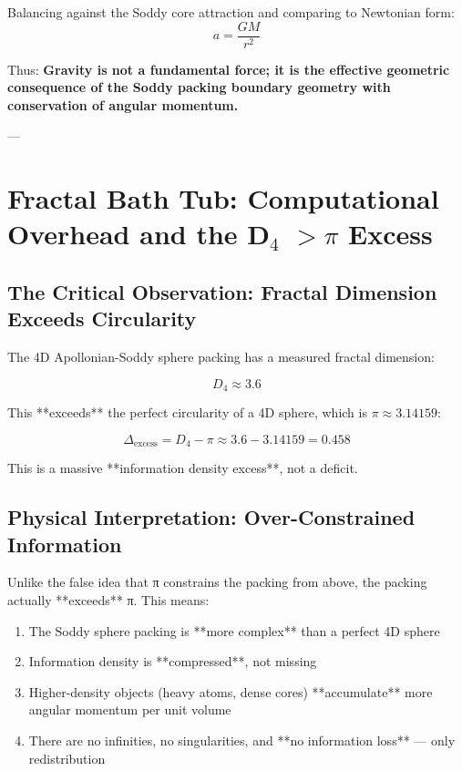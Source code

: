 \documentclass[11pt,a4paper]{article}
\begin{document}
    Balancing against the Soddy core attraction and comparing to Newtonian form:
    \[
    a = \frac{GM}{r^2}
    \]

    Thus: \textbf{Gravity is not a fundamental force; it is the effective geometric consequence of the Soddy packing boundary geometry with conservation of angular momentum.}

---


\section{Fractal Bath Tub: Computational Overhead and the D$_4$ $> \pi$ Excess}

  \subsection{The Critical Observation: Fractal Dimension Exceeds Circularity}

    The 4D Apollonian-Soddy sphere packing has a measured fractal dimension:

    \[
    D_4 \approx 3.6
    \]

    This **exceeds** the perfect circularity of a 4D sphere, which is $\pi \approx 3.14159$:

    \[
    \Delta_{\text{excess}} = D_4 - \pi \approx 3.6 - 3.14159 = 0.458
    \]

    This is a massive **information density excess**, not a deficit.

  \subsection{Physical Interpretation: Over-Constrained Information}

    Unlike the false idea that π constrains the packing from above, the packing actually **exceeds** π. This means:

    \begin{enumerate}

    \item The Soddy sphere packing is **more complex** than a perfect 4D sphere
    \item Information density is **compressed**, not missing
    \item Higher-density objects (heavy atoms, dense cores) **accumulate** more angular momentum per unit volume
    \item There are no infinities, no singularities, and **no information loss** — only redistribution

    \end{enumerate}
\end{document}
